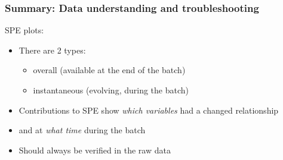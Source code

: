 \begin{frame}\frametitle{Summary: Data understanding and troubleshooting}
	
SPE plots: \hfill {}

\begin{itemize}
	\item	There are 2 types:
	
			\begin{itemize}
				\item	overall (available at the end of the batch)
				
				\item	instantaneous (evolving, during the batch)
			\end{itemize}
			
	\item	Contributions to SPE show \emph{which variables} had a changed relationship
	
	\item	and at \emph{what time} during the batch
	
	\item	Should always be verified in the raw data
\end{itemize}

\end{frame}

